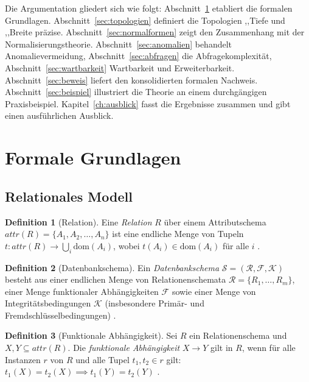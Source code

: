 ﻿\documentclass[a4paper,12pt]{report}
\theoremstyle{definition}
\newtheorem{definition}{Definition}[chapter]
\theoremstyle{remark}
\newcommand{\att}{\mathit{attr}}
\begin{document}
Die Argumentation gliedert sich wie folgt: Abschnitt~\ref{sec:grundlagen}
etabliert die formalen Grundlagen. Abschnitt~\ref{sec:topologien} definiert
die Topologien ,,Tiefe\grqq{} und ,,Breite\grqq{} präzise.
Abschnitt~\ref{sec:normalformen} zeigt den Zusammenhang mit der
Normalisierungstheorie. Abschnitt~\ref{sec:anomalien} behandelt
Anomalievermeidung, Abschnitt~\ref{sec:abfragen} die Abfragekomplexität,
Abschnitt~\ref{sec:wartbarkeit} Wartbarkeit und Erweiterbarkeit.
Abschnitt~\ref{sec:beweis} liefert den konsolidierten formalen Nachweis.
Abschnitt~\ref{sec:beispiel} illustriert die Theorie an einem durchgängigen
Praxisbeispiel. Kapitel~\ref{ch:ausblick} fasst die Ergebnisse zusammen
und gibt einen ausführlichen Ausblick.

\section{Formale Grundlagen}
\label{sec:grundlagen}

\subsection{Relationales Modell}

\begin{definition}[Relation]
Eine \emph{Relation} $R$ über einem Attributschema $\att(R) = \{A_1, A_2, \ldots, A_n\}$
ist eine endliche Menge von Tupeln $t: \att(R) \to \bigcup_{i} \mathrm{dom}(A_i)$,
wobei $t(A_i) \in \mathrm{dom}(A_i)$ für alle $i$ \cite{Codd1970}.
\end{definition}

\begin{definition}[Datenbankschema]
Ein \emph{Datenbankschema} $\mathcal{S} = (\mathcal{R}, \mathcal{F}, \mathcal{K})$
besteht aus einer endlichen Menge von Relationenschemata $\mathcal{R} = \{R_1, \ldots, R_m\}$,
einer Menge funktionaler Abhängigkeiten $\mathcal{F}$ sowie einer Menge von
Integritätsbedingungen $\mathcal{K}$ (insbesondere Primär- und Fremdschlüsselbedingungen)
\cite{Ullman1988}.
\end{definition}

\begin{definition}[Funktionale Abhängigkeit]
Sei $R$ ein Relationenschema und $X, Y \subseteq \att(R)$.
Die \emph{funktionale Abhängigkeit} $X \to Y$ gilt in $R$, wenn für alle
Instanzen $r$ von $R$ und alle Tupel $t_1, t_2 \in r$ gilt:
$t_1(X) = t_2(X) \implies t_1(Y) = t_2(Y)$ \cite{Armstrong1974}.
\end{definition}
\end{document}
